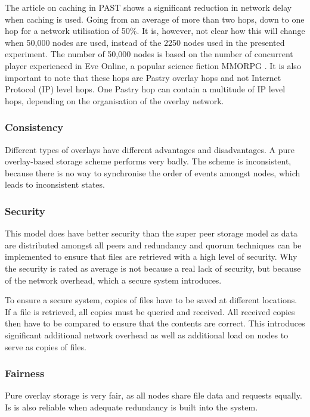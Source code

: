 \documentclass[10pt,a4paper,journal,cspaper,compsoc]{IEEEtran}
\begin{document}
The article on caching in PAST shows a significant reduction in network delay when caching is used. Going from an average of more than two hops, down
to one hop for a network utilisation of 50\%. It is, however, not clear how this will change when 50,000 nodes are used, instead of the 2250 nodes
used in the presented experiment. The number of 50,000 nodes is based on the number of concurrent player experienced in Eve Online, a popular science
fiction MMORPG \cite{eve_pcu}. It is also important to note that these hops are Pastry overlay hops and not Internet Protocol (IP) level hops. One
Pastry hop can contain a multitude of IP level hops, depending on the organisation of the overlay network.


\subsubsection{Consistency}
Different types of overlays have different advantages and disadvantages. A pure overlay-based storage scheme performs very badly. The scheme is
inconsistent, because there is no way to synchronise the order of events amongst nodes, which leads to inconsistent states.

\subsubsection{Security}
This model does have better security than the super peer storage model as data are distributed amongst all peers and redundancy and quorum techniques
can be implemented to ensure that files are retrieved with a high level of security. Why the security is rated as average is not because a real lack
of security, but because of the network overhead, which a secure system introduces.

To ensure a secure system, copies of files have to be saved at different locations. If a file is retrieved, all copies must be queried and received.
All received copies then have to be compared to ensure that the contents are correct. This introduces significant additional network overhead as well
as additional load on nodes to serve as copies of files.

\subsubsection{Fairness}
Pure overlay storage is very fair, as all nodes share file data and requests equally. Is is also reliable when adequate redundancy is built into the
system.
\end{document}
